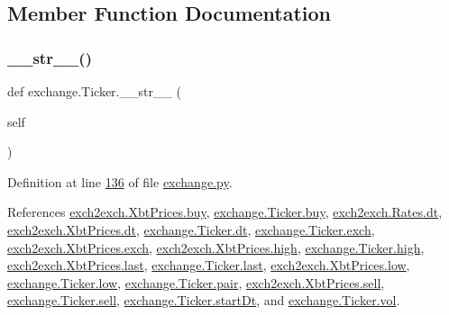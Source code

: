 \subsection{Member Function Documentation}
\mbox{\label{classexchange_1_1_ticker_af91836a1c408f54dda95d9865cefba45}} 
\subsubsection{\texorpdfstring{\+\_\+\+\_\+str\+\_\+\+\_\+()}{\_\_str\_\_()}}
{\footnotesize\ttfamily def exchange.\+Ticker.\+\_\+\+\_\+str\+\_\+\+\_\+ (\begin{DoxyParamCaption}\item[{}]{self }\end{DoxyParamCaption})}



Definition at line \hyperlink{exchange_8py_source_l00136}{136} of file \hyperlink{exchange_8py_source}{exchange.\+py}.



References \hyperlink{exch2exch_8py_source_l00059}{exch2exch.\+Xbt\+Prices.\+buy}, \hyperlink{exchange_8py_source_l00060}{exchange.\+Ticker.\+buy}, \hyperlink{exch2exch_8py_source_l00028}{exch2exch.\+Rates.\+dt}, \hyperlink{exch2exch_8py_source_l00057}{exch2exch.\+Xbt\+Prices.\+dt}, \hyperlink{exchange_8py_source_l00059}{exchange.\+Ticker.\+dt}, \hyperlink{exchange_8py_source_l00057}{exchange.\+Ticker.\+exch}, \hyperlink{exch2exch_8py_source_l00064}{exch2exch.\+Xbt\+Prices.\+exch}, \hyperlink{exch2exch_8py_source_l00061}{exch2exch.\+Xbt\+Prices.\+high}, \hyperlink{exchange_8py_source_l00062}{exchange.\+Ticker.\+high}, \hyperlink{exch2exch_8py_source_l00063}{exch2exch.\+Xbt\+Prices.\+last}, \hyperlink{exchange_8py_source_l00064}{exchange.\+Ticker.\+last}, \hyperlink{exch2exch_8py_source_l00062}{exch2exch.\+Xbt\+Prices.\+low}, \hyperlink{exchange_8py_source_l00063}{exchange.\+Ticker.\+low}, \hyperlink{exchange_8py_source_l00058}{exchange.\+Ticker.\+pair}, \hyperlink{exch2exch_8py_source_l00058}{exch2exch.\+Xbt\+Prices.\+sell}, \hyperlink{exchange_8py_source_l00061}{exchange.\+Ticker.\+sell}, \hyperlink{exchange_8py_source_l00067}{exchange.\+Ticker.\+start\+Dt}, and \hyperlink{exchange_8py_source_l00065}{exchange.\+Ticker.\+vol}.


